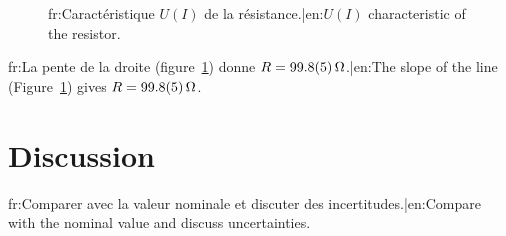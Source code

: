 \documentclass[11pt,a4paper]{article}
\begin{document}
\begin{figure}[H]
  \centering
  \caption{{{fr:Caractéristique $U(I)$ de la résistance.|en:$U(I)$ characteristic of the resistor.}}}
  \label{fig:caracteristique}
\end{figure}

{{fr:La pente de la droite (figure~\ref{fig:caracteristique}) donne $R = \qty{99.8 \pm 0.5}{\ohm}$.|en:The slope of the line (Figure~\ref{fig:caracteristique}) gives $R = \qty{99.8 \pm 0.5}{\ohm}$.}}

\section{Discussion}
{{fr:Comparer avec la valeur nominale et discuter des incertitudes.|en:Compare with the nominal value and discuss uncertainties.}}
\end{document}
